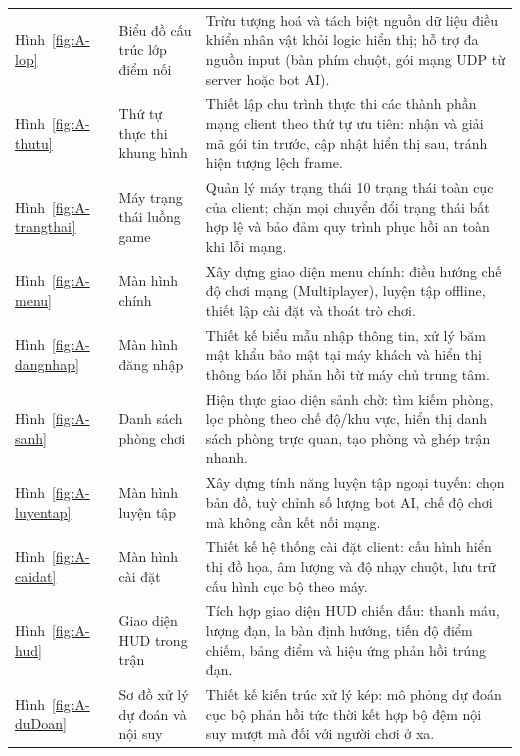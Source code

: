 \begin{center}\small
\begin{tabularx}{\linewidth}{|L{2.2cm}|L{4.2cm}|Y|}
\hline
{} &  &  \\ \hline
Hình~\ref{fig:A-lop} & Biểu đồ cấu trúc lớp điểm nối & Trừu tượng hoá và tách biệt nguồn dữ liệu điều khiển nhân vật khỏi logic hiển thị; hỗ trợ đa nguồn input (bàn phím chuột, gói mạng UDP từ server hoặc bot AI). \\ \hline
Hình~\ref{fig:A-thutu} & Thứ tự thực thi khung hình & Thiết lập chu trình thực thi các thành phần mạng client theo thứ tự ưu tiên: nhận và giải mã gói tin trước, cập nhật hiển thị sau, tránh hiện tượng lệch frame. \\ \hline
Hình~\ref{fig:A-trangthai} & Máy trạng thái luồng game & Quản lý máy trạng thái 10 trạng thái toàn cục của client; chặn mọi chuyển đổi trạng thái bất hợp lệ và bảo đảm quy trình phục hồi an toàn khi lỗi mạng. \\ \hline
Hình~\ref{fig:A-menu} & Màn hình chính & Xây dựng giao diện menu chính: điều hướng chế độ chơi mạng (Multiplayer), luyện tập offline, thiết lập cài đặt và thoát trò chơi. \\ \hline
Hình~\ref{fig:A-dangnhap} & Màn hình đăng nhập & Thiết kế biểu mẫu nhập thông tin, xử lý băm mật khẩu bảo mật tại máy khách và hiển thị thông báo lỗi phản hồi từ máy chủ trung tâm. \\ \hline
Hình~\ref{fig:A-sanh} & Danh sách phòng chơi & Hiện thực giao diện sảnh chờ: tìm kiếm phòng, lọc phòng theo chế độ/khu vực, hiển thị danh sách phòng trực quan, tạo phòng và ghép trận nhanh. \\ \hline
Hình~\ref{fig:A-luyentap} & Màn hình luyện tập & Xây dựng tính năng luyện tập ngoại tuyến: chọn bản đồ, tuỳ chỉnh số lượng bot AI, chế độ chơi mà không cần kết nối mạng. \\ \hline
Hình~\ref{fig:A-caidat} & Màn hình cài đặt & Thiết kế hệ thống cài đặt client: cấu hình hiển thị đồ họa, âm lượng và độ nhạy chuột, lưu trữ cấu hình cục bộ theo máy. \\ \hline
Hình~\ref{fig:A-hud} & Giao diện HUD trong trận & Tích hợp giao diện HUD chiến đấu: thanh máu, lượng đạn, la bàn định hướng, tiến độ điểm chiếm, bảng điểm và hiệu ứng phản hồi trúng đạn. \\ \hline
Hình~\ref{fig:A-duDoan} & Sơ đồ xử lý dự đoán và nội suy & Thiết kế kiến trúc xử lý kép: mô phỏng dự đoán cục bộ phản hồi tức thời kết hợp bộ đệm nội suy mượt mà đối với người chơi ở xa. \\ \hline

\end{tabularx}
\end{center}
